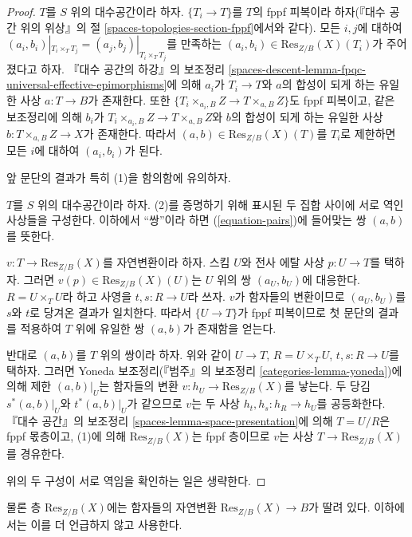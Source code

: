 \begin{proof}
$T$를 $S$ 위의 대수공간이라 하자. $\{T_i \to T\}$를 $T$의
fppf 피복이라 하자(『대수 공간 위의 위상』의 절
\ref{spaces-topologies-section-fppf}에서와 같다).
모든 $i, j$에 대하여
$(a_i, b_i)|_{T_i \times_T T_j} = (a_j, b_j)|_{T_i \times_T T_j}$를
만족하는 $(a_i, b_i) \in \text{Res}_{Z/B}(X)(T_i)$가 주어졌다고 하자.
『대수 공간의 하강』의 보조정리
\ref{spaces-descent-lemma-fpqc-universal-effective-epimorphisms}에 의해
$a_i$가 $T_i \to T$와 $a$의 합성이 되게 하는 유일한 사상
$a : T \to B$가 존재한다. 또한
$\{T_i \times_{a_i, B} Z \to T \times_{a, B} Z\}$도 fppf 피복이고,
같은 보조정리에 의해 $b_i$가
$T_i \times_{a_i, B} Z \to T \times_{a, B} Z$와 $b$의 합성이 되게
하는 유일한 사상 $b : T \times_{a, B} Z \to X$가 존재한다.
따라서 $(a, b) \in \text{Res}_{Z/B}(X)(T)$를 $T_i$로 제한하면
모든 $i$에 대하여 $(a_i, b_i)$가 된다.

\medskip\noindent
앞 문단의 결과가 특히 (1)을 함의함에 유의하자.

\medskip\noindent
$T$를 $S$ 위의 대수공간이라 하자. (2)를 증명하기 위해 표시된
두 집합 사이에 서로 역인 사상들을 구성한다. 이하에서 “쌍”이라 하면
(\ref{equation-pairs})에 들어맞는 쌍 $(a, b)$를 뜻한다.

\medskip\noindent
$v : T \to \text{Res}_{Z/B}(X)$를 자연변환이라 하자.
스킴 $U$와 전사 에탈 사상 $p : U \to T$를 택하자.
그러면 $v(p) \in \text{Res}_{Z/B}(X)(U)$는 $U$ 위의 쌍
$(a_U, b_U)$에 대응한다. $R = U \times_T U$라 하고 사영을
$t, s : R \to U$라 쓰자. $v$가 함자들의 변환이므로
$(a_U, b_U)$를 $s$와 $t$로 당겨온 결과가 일치한다.
따라서 $\{U \to T\}$가 fppf 피복이므로 첫 문단의 결과를 적용하여
$T$ 위에 유일한 쌍 $(a, b)$가 존재함을 얻는다.

\medskip\noindent
반대로 $(a, b)$를 $T$ 위의 쌍이라 하자. 위와 같이
$U \to T$, $R = U \times_T U$, $t, s : R \to U$를 택하자.
그러면 Yoneda 보조정리(『범주』의 보조정리
\ref{categories-lemma-yoneda})에 의해 제한 $(a, b)|_U$는 함자들의
변환 $v : h_U \to \text{Res}_{Z/B}(X)$를 낳는다.
두 당김 $s^*(a, b)|_U$와 $t^*(a, b)|_U$가 같으므로 $v$는
두 사상 $h_t, h_s : h_R \to h_U$를 공등화한다.
『대수 공간』의 보조정리 \ref{spaces-lemma-space-presentation}에 의해
$T = U/R$은 fppf 몫층이고, (1)에 의해
$\text{Res}_{Z/B}(X)$는 fppf 층이므로 $v$는 사상
$T \to \text{Res}_{Z/B}(X)$를 경유한다.

\medskip\noindent
위의 두 구성이 서로 역임을 확인하는 일은 생략한다.
\end{proof}

\noindent
물론 층 $\text{Res}_{Z/B}(X)$에는 함자들의 자연변환
$\text{Res}_{Z/B}(X) \to B$가 딸려 있다. 이하에서는 이를 더 언급하지
않고 사용한다.

